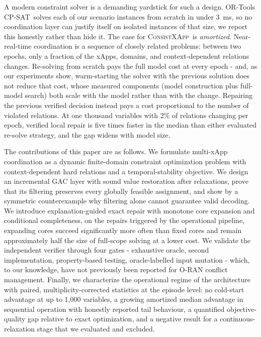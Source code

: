 \documentclass[pdflatex,sn-mathphys-num,iicol,oneside]{sn-jnl}
\newcommand{\method}{\textsc{ConsistXApp}}
\newcommand{\cpsat}{\textsc{CP-SAT}}
\begin{document}
A modern constraint solver is a demanding yardstick for such a
design. OR-Tools \cpsat\ solves each of our scenario instances from
scratch in under 3~ms, so no coordination layer can justify itself on
isolated instances of that size, we report this honestly rather than
hide it. The case for \method\ is \emph{amortized}. Near-real-time
coordination is a sequence of closely related problems: between two
epochs, only a fraction of the xApps, domains, and context-dependent
relations changes. Re-solving from scratch pays the full model cost at
every epoch - and, as our experiments show, warm-starting the solver
with the previous solution does not reduce that cost, whose measured
components (model construction plus full-model search) both scale with
the model rather than with the change. Repairing the previous verified
decision instead pays a cost proportional to the number of violated
relations. At one thousand variables with 2\% of relations changing
per epoch, verified local repair is five times faster in the median
than either evaluated re-solve strategy, and the gap widens with model
size.

The contributions of this paper are as follows. We formulate
multi-xApp coordination as a dynamic finite-domain constraint
optimization problem with context-dependent hard relations and a
temporal-stability objective. We design an incremental GAC layer with
sound value restoration after relaxations, prove that its filtering
preserves every globally feasible assignment, and show by a symmetric
counterexample why filtering alone cannot guarantee valid decoding.
We introduce explanation-guided exact repair with monotone core
expansion and conditional completeness, on the repairs triggered by
the operational pipeline, expanding cores succeed significantly more
often than fixed cores and remain approximately half the size of
full-scope solving at a lower cost. We validate the independent verifier through four
gates - exhaustive oracle, second implementation, property-based
testing, oracle-labelled input mutation - which, to our knowledge,
have not previously been reported for O-RAN conflict management.
Finally, we characterize the operational regime of the architecture
with paired, multiplicity-corrected statistics at the episode level:
no cold-start advantage at up to 1{,}000 variables, a growing
amortized median advantage in sequential operation with honestly
reported tail behaviour, a quantified objective-quality gap relative
to exact optimization, and a negative result for a
continuous-relaxation stage that we evaluated and excluded.
\end{document}
